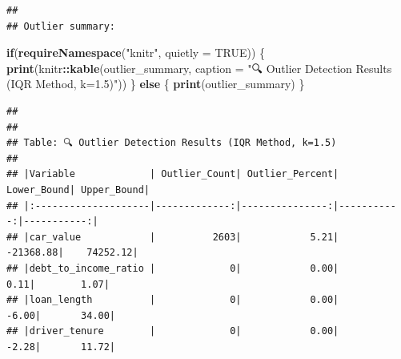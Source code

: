 \documentclass[
]{article}
\newenvironment{Shaded}{\begin{snugshade}}{\end{snugshade}}
\newcommand{\AttributeTok}[1]{\textcolor[rgb]{0.13,0.29,0.53}{#1}}
\newcommand{\ConstantTok}[1]{\textcolor[rgb]{0.56,0.35,0.01}{#1}}
\newcommand{\ControlFlowTok}[1]{\textcolor[rgb]{0.13,0.29,0.53}{\textbf{#1}}}
\newcommand{\FunctionTok}[1]{\textcolor[rgb]{0.13,0.29,0.53}{\textbf{#1}}}
\newcommand{\NormalTok}[1]{#1}
\newcommand{\SpecialCharTok}[1]{\textcolor[rgb]{0.81,0.36,0.00}{\textbf{#1}}}
\newcommand{\StringTok}[1]{\textcolor[rgb]{0.31,0.60,0.02}{#1}}
\begin{document}
\begin{verbatim}
## 
## Outlier summary:
\end{verbatim}

\begin{Shaded}
\begin{Highlighting}[]
\ControlFlowTok{if}\NormalTok{(}\FunctionTok{requireNamespace}\NormalTok{(}\StringTok{"knitr"}\NormalTok{, }\AttributeTok{quietly =} \ConstantTok{TRUE}\NormalTok{)) \{}
  \FunctionTok{print}\NormalTok{(knitr}\SpecialCharTok{::}\FunctionTok{kable}\NormalTok{(outlier\_summary, }\AttributeTok{caption =} \StringTok{"🔍 Outlier Detection Results (IQR Method, k=1.5)"}\NormalTok{))}
\NormalTok{\} }\ControlFlowTok{else}\NormalTok{ \{}
  \FunctionTok{print}\NormalTok{(outlier\_summary)}
\NormalTok{\}}
\end{Highlighting}
\end{Shaded}

\begin{verbatim}
## 
## 
## Table: 🔍 Outlier Detection Results (IQR Method, k=1.5)
## 
## |Variable             | Outlier_Count| Outlier_Percent| Lower_Bound| Upper_Bound|
## |:--------------------|-------------:|---------------:|-----------:|-----------:|
## |car_value            |          2603|            5.21|   -21368.88|    74252.12|
## |debt_to_income_ratio |             0|            0.00|        0.11|        1.07|
## |loan_length          |             0|            0.00|       -6.00|       34.00|
## |driver_tenure        |             0|            0.00|       -2.28|       11.72|
\end{verbatim}
\end{document}
